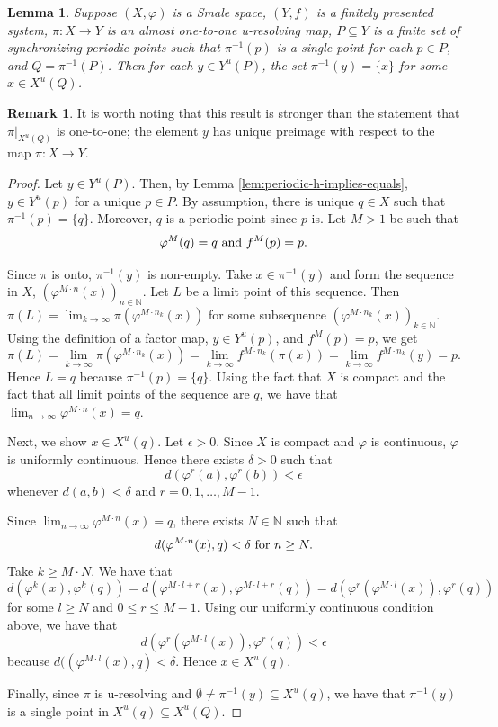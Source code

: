 \documentclass{amsart}
\newcommand{\N}{\mathbb{N}}
\theoremstyle{plain}
\newtheorem{lemma}[theorem]{Lemma}
\theoremstyle{definition}
\newtheorem{remark}[theorem]{Remark}
\theoremstyle{remark}
\begin{document}
\begin{lemma} \label{lem:one-to-one-Xu(P)}
Suppose $(X, \varphi)$ is a Smale space, $(Y, f)$ is a finitely presented system, $\pi: X \rightarrow Y$ is an almost one-to-one u-resolving map, $P \subseteq Y$ is a finite set of synchronizing periodic points such that $\pi^{-1}(p)$ is a single point for each $p\in P$, and $Q=\pi^{-1}(P)$. Then for each $y\in Y^u(P)$, the set $\pi^{-1}(y)=\{ x\}$ for some $x\in X^u(Q)$. 
\end{lemma}
\begin{remark}
It is worth noting that this result is stronger than the statement that $\pi|_{X^u(Q)}$ is one-to-one; the element $y$ has unique preimage with respect to the map $\pi : X \rightarrow Y$.
\end{remark}
\begin{proof}
Let $y\in Y^u(P)$. Then, by Lemma \ref{lem:periodic-h-implies-equals},  $y \in Y^u(p)$ for a unique $p\in P$. By assumption, there is unique $q\in X$ such that $\pi^{-1}(p)=\{ q \}$. Moreover, $q$ is a periodic point since $p$ is. Let $M>1$ be such that 
\[
\varphi^M(q)=q \hbox{ and }f^M(p)=p.
\]

Since $\pi$ is onto, $\pi^{-1}(y)$ is non-empty. Take $x\in \pi^{-1}(y)$ and form the sequence in $X$, $(\varphi^{M\cdot n}(x))_{n\in \N}$. Let $L$ be a limit point of this sequence. Then $\pi(L)=\lim_{k\rightarrow \infty} \pi( \varphi^{M\cdot n_k}(x))$ for some subsequence $(\varphi^{M\cdot n_k}(x))_{k\in \N}$. Using the definition of a factor map, $y\in Y^u(p)$, and $f^M(p)=p$, we get
\[
\pi(L)=\lim_{k\rightarrow \infty} \pi( \varphi^{M\cdot n_k}(x))=\lim_{k\rightarrow \infty} f^{M\cdot n_k}(\pi(x))=\lim_{k\rightarrow \infty}f^{M\cdot n_k}(y)=p.
\]
Hence $L=q$ because $\pi^{-1}(p)=\{q\}$. Using the fact that $X$ is compact and the fact that all limit points of the sequence are $q$, we have that $\lim_{n \rightarrow \infty} \varphi^{M\cdot n}(x)=q$. 

Next, we show $x \in X^u(q)$. Let $\epsilon>0$. Since $X$ is compact and $\varphi$ is continuous, $\varphi$ is uniformly continuous. Hence there exists $\delta>0$ such that 
\[
d(\varphi^r(a), \varphi^r(b))<\epsilon
\]
whenever $d(a, b)<\delta$ and $r=0, 1, \ldots, M-1$.

Since $\lim_{n \rightarrow \infty} \varphi^{M\cdot n}(x)=q$, there exists $N\in \N$ such that 
\[
d(\varphi^{M\cdot n}(x), q) < \delta \hbox{ for }n\ge N.
\]
Take $k \geq M \cdot N$. We have that
\[
d(\varphi^k(x), \varphi^k(q))=d(\varphi^{M\cdot l + r}(x), \varphi^{M\cdot l + r}(q))=d(\varphi^r(\varphi^{M\cdot l}(x)), \varphi^r(q))
\]
for some $l\ge N$ and $0\le r \le M-1$. Using our uniformly continuous condition above, we have that 
\[ d(\varphi^r(\varphi^{M\cdot l}(x)), \varphi^r(q))< \epsilon \]
because $d((\varphi^{M\cdot l}(x), q)< \delta$. Hence $x\in X^u(q)$.

Finally, since $\pi$ is u-resolving and $\emptyset \neq \pi^{-1}(y) \subseteq X^u(q)$, we have that $\pi^{-1}(y)$ is a single point in $X^u(q) \subseteq X^u(Q)$.
\end{proof}
\end{document}
